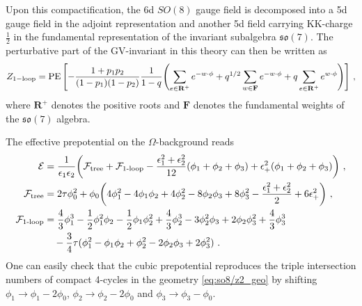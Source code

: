 Upon this compactification, the 6d $SO(8)$ gauge field is decomposed into a 5d gauge field in the adjoint representation and another 5d field carrying KK-charge $\frac{1}{2}$ in the fundamental representation of the invariant subalgebra $ \mathfrak{so}(7)$. The perturbative part of the GV-invariant in this theory can then be written as
\begin{align}
Z_{\mathrm{1-loop}}
= \operatorname{PE} \qty[-\frac{1+p_1 p_2}{(1-p_1)(1-p_2)} \frac{1}{1-q} \qty( \sum_{e \in \mathbf{R}^+} e^{-w\cdot \phi} + q^{1/2} \sum_{w \in \mathbf{F}} e^{-w\cdot \phi} + q \sum_{e \in \mathbf{R}^+} e^{w\cdot \phi} ) ] \ ,
\end{align}
where  $ \mathbf{R}^+ $ denotes the positive roots and $ \mathbf{F} $ denotes the fundamental weights of the $ \mathfrak{so}(7) $ algebra.

The effective prepotential on the $\Omega$-background reads
\begin{align}
\mathcal{E} &= \frac{1}{\epsilon_1 \epsilon_2} \qty( \mathcal{F}_{\mathrm{tree}} + \mathcal{F}_{\text{1-loop}} - \frac{\epsilon_1^2 + \epsilon_2^2}{12}(\phi_1 + \phi_2 + \phi_3) +\epsilon_+^2 (\phi_1 + \phi_2 + \phi_3)  ) \ , \nonumber \\
\mathcal{F}_{\mathrm{tree}} &= 2\tau \phi_0^2 + \phi_0 \qty(4\phi_1^2 - 4\phi_1 \phi_2 + 4\phi_2^2 - 8\phi_2 \phi_3 + 8\phi_3^2 -\frac{\epsilon_1^2 + \epsilon_2^2}{2} + 6\epsilon_+^2)\ , \nonumber \\
\mathcal{F}_{\text{1-loop}} &= \frac{4}{3}\phi_1^3 - \frac{1}{2} \phi_1^2 \phi_2 - \frac{1}{2} \phi_1 \phi_2^2 + \frac{4}{3}\phi_2^3 - 3\phi_2^2 \phi_3 + 2\phi_2 \phi_3^2 + \frac{4}{3}\phi_3^3 \nonumber \\
& \quad  - \frac{3}{4}\tau (\phi_1^2 - \phi_1 \phi_2 + \phi_2^2 - 2\phi_2 \phi_3 + 2\phi_3^2)\ .
\end{align}
One can easily check that the cubic prepotential reproduces the triple intersection numbers of compact 4-cycles in the geometry \eqref{eq:so8/z2_geo} by shifting $ \phi_1 \to \phi_1 - 2\phi_0 $, $ \phi_2 \to \phi_2 - 2\phi_0 $ and $ \phi_3 \to \phi_3 - \phi_0 $.

